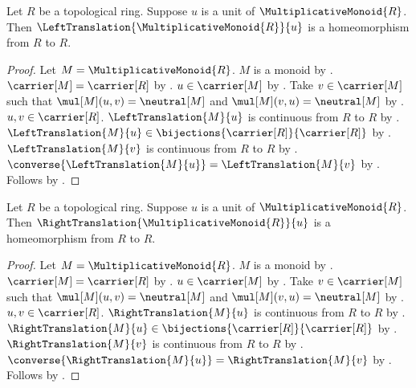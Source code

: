 \begin{theorem}\label{topological_ring_unit_left_multiplication_homeomorphism}
    Let $R$ be a topological ring.
    Suppose $u$ is a unit of $\MultiplicativeMonoid{R}$.
    Then $\LeftTranslation{\MultiplicativeMonoid{R}}{u}$ is a
        homeomorphism from $R$ to $R$.
\end{theorem}
\begin{proof}
    Let $M=\MultiplicativeMonoid{R}$.
    $M$ is a monoid by .
    $\carrier[M]=\carrier[R]$ by .
    $u\in\carrier[M]$ by .
    Take $v\in\carrier[M]$ such that
        $\mul[M](u,v)=\neutral[M]$ and
        $\mul[M](v,u)=\neutral[M]$ by
        .
    $u,v\in\carrier[R]$.
    $\LeftTranslation{M}{u}$ is continuous from $R$ to $R$
        by .
    $\LeftTranslation{M}{u}\in
        \bijections{\carrier[R]}{\carrier[R]}$ by
        .
    $\LeftTranslation{M}{v}$ is continuous from $R$ to $R$
        by .
    $\converse{\LeftTranslation{M}{u}}=\LeftTranslation{M}{v}$
        by .
    Follows by .
\end{proof}

\begin{theorem}\label{topological_ring_unit_right_multiplication_homeomorphism}
    Let $R$ be a topological ring.
    Suppose $u$ is a unit of $\MultiplicativeMonoid{R}$.
    Then $\RightTranslation{\MultiplicativeMonoid{R}}{u}$ is a
        homeomorphism from $R$ to $R$.
\end{theorem}
\begin{proof}
    Let $M=\MultiplicativeMonoid{R}$.
    $M$ is a monoid by .
    $\carrier[M]=\carrier[R]$ by .
    $u\in\carrier[M]$ by .
    Take $v\in\carrier[M]$ such that
        $\mul[M](u,v)=\neutral[M]$ and
        $\mul[M](v,u)=\neutral[M]$ by
        .
    $u,v\in\carrier[R]$.
    $\RightTranslation{M}{u}$ is continuous from $R$ to $R$
        by .
    $\RightTranslation{M}{u}\in
        \bijections{\carrier[R]}{\carrier[R]}$ by
        .
    $\RightTranslation{M}{v}$ is continuous from $R$ to $R$
        by .
    $\converse{\RightTranslation{M}{u}}=\RightTranslation{M}{v}$
        by .
    Follows by .
\end{proof}

